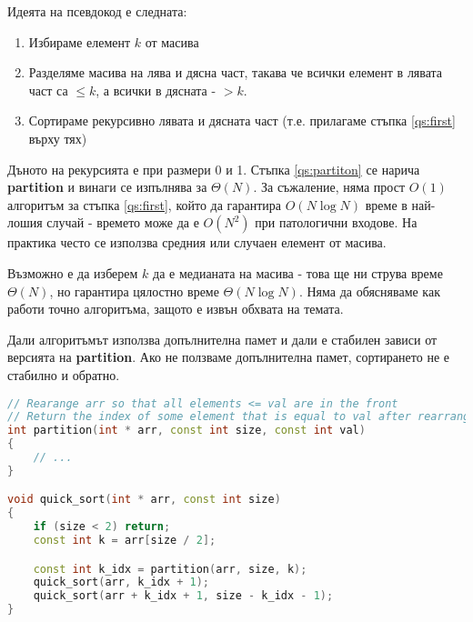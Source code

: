 \documentclass[fleqn,12pt]{article}
\begin{document}
Идеята на псевдокод е следната:
\begin{enumerate}
    \item \label{qs:first} Избираме елемент $k$ от масива
    \item \label{qs:partiton} Разделяме масива на лява и дясна част, такава че всички елемент в лявата част са $\leq k$, а всички в дясната - $> k$.
    \item Сортираме рекурсивно лявата и дясната част (т.е. прилагаме стъпка \ref{qs:first} върху тях)
\end{enumerate}

Дъното на рекурсията е при размери 0 и 1. Стъпка \ref{qs:partiton} се нарича \textbf{partition} и винаги се изпълнява за $\Theta(N)$.
За съжаление, няма прост $O(1)$ алгоритъм за стъпка \ref{qs:first}, който да гарантира $O(N \log N)$ време в най-лошия случай - времето може да е $O(N^2)$
при патологични входове. На практика често се използва средния или случаен елемент от масива.

Възможно е да изберем $k$ да е медианата на масива - това ще ни струва време $\Theta(N)$, но гарантира цялостно време $\Theta(N \log N)$.
Няма да обясняваме как работи точно алгоритъма, защото е извън обхвата на темата.

Дали алгоритъмът използва допълнителна памет и дали е стабилен зависи от версията на \textbf{partition}. Ако не ползваме допълнителна памет,
сортирането не е стабилно и обратно.

\begin{lstlisting}[language=C++, caption=QuickSort]
// Rearange arr so that all elements <= val are in the front
// Return the index of some element that is equal to val after rearranging
int partition(int * arr, const int size, const int val)
{
    // ...
}

void quick_sort(int * arr, const int size)
{
    if (size < 2) return;
    const int k = arr[size / 2];

    const int k_idx = partition(arr, size, k);
    quick_sort(arr, k_idx + 1);
    quick_sort(arr + k_idx + 1, size - k_idx - 1);
}
\end{lstlisting}
\end{document}
